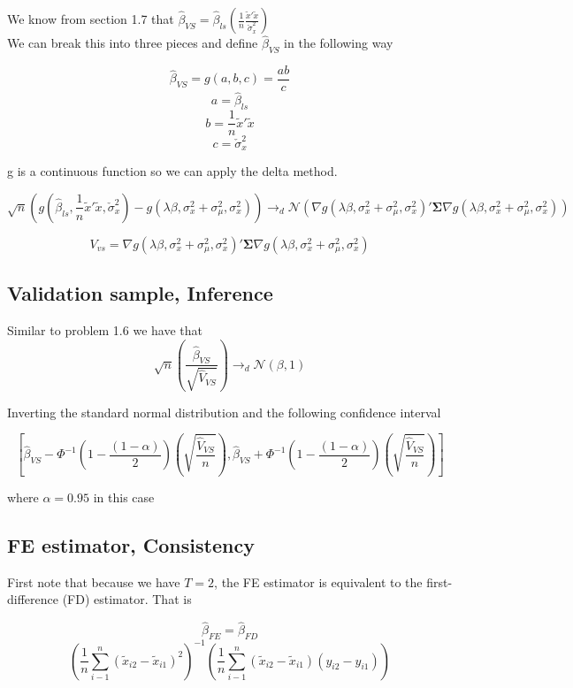 \documentclass[11pt]{article}
\begin{document}
We know from section 1.7 that  $\hat{\beta}_{VS} = \hat{\beta}_{ls}\left(\frac{1}{n}\frac{\tilde{x}'\tilde{x}}{\check{\sigma}_x^2} \right)$ \\

We can break this into three pieces and define $\hat{\beta}_{VS}$ in the following way 

$$\hat{\beta}_{VS} = g(a,b,c) = \frac{ab}{c} $$
$$ a = \hat{\beta}_{ls} $$
$$ b = \frac{1}{n}\tilde{x}'\tilde{x} $$
$$ c = \check{\sigma}_x^2 $$

g is a continuous function so we can apply the delta method. 

$$ \sqrt{n} \left( g \left( \hat{\beta}_{ls}, \frac{1}{n}\tilde{x}'\tilde{x}, \check{\sigma}_x^2 \right) - g \left( \lambda \beta, \sigma_x^2 + \sigma_{\mu}^2, \sigma_x^2 \right) \right) \to_d 
\mathcal{N} \left( \nabla g \left( \lambda \beta, \sigma_x^2 + \sigma_{\mu}^2, \sigma_x^2 \right)' 
\bm{\Sigma} 
\nabla g \left( \lambda \beta, \sigma_x^2 + \sigma_{\mu}^2, \sigma_x^2 \right) \right) $$

$$ V_{vs} =  \nabla g \left( \lambda \beta, \sigma_x^2 + \sigma_{\mu}^2, \sigma_x^2 \right)' 
\bm{\Sigma} 
\nabla g \left( \lambda \beta, \sigma_x^2 + \sigma_{\mu}^2, \sigma_x^2 \right) $$

\subsection{Validation sample, Inference}

Similar to problem 1.6 we have that 
$$
\sqrt{n} \left( \frac{\hat{\beta}_{VS}}{\sqrt{\hat{V}_{VS} }} \right) \to_d \mathcal{N}(\beta,1)
$$


Inverting the standard normal distribution and the following confidence interval 

$$ \left[ \hat{\beta}_{VS} - \Phi^{-1} \left( 1 -\frac{(1-\alpha)}{2} \right) \left( \sqrt{\frac{\hat{V}_{VS} }{n}} \right),  \hat{\beta}_{VS} + \Phi^{-1} \left( 1 -\frac{(1-\alpha)}{2} \right) \left( \sqrt{\frac{\hat{V}_{VS} }{n}} \right) \right] $$

where $\alpha = 0.95$ in this case 

\subsection{FE estimator, Consistency}
First note that because we have $T=2$, the FE estimator is equivalent to the first-difference (FD) estimator. That is 


$$\hat{\beta}_{FE} = \hat{\beta}_{FD} $$
$$ \left( \frac{1}{n} \sum_{i-1}^{n}(\tilde{x}_{i2} - \tilde{x}_{i1} )^2 \right)^{-1} 
 \left( \frac{1}{n} \sum_{i-1}^{n}(\tilde{x}_{i2} - \tilde{x}_{i1} )(y_{i2}-y_{i1}) \right)$$
 
\end{document}
